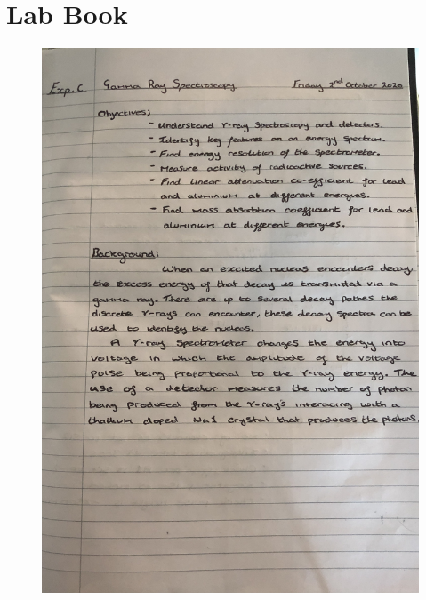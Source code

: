 \documentclass[12pt]{article}
\begin{document}
\newpage
\section{Lab Book}
\label{Lab BookSection}

\begin{figure}[H]
\centering
\includegraphics[scale=0.18]{Images/IMG_0330.JPG}
\end{figure}
\newpage
\end{document}
